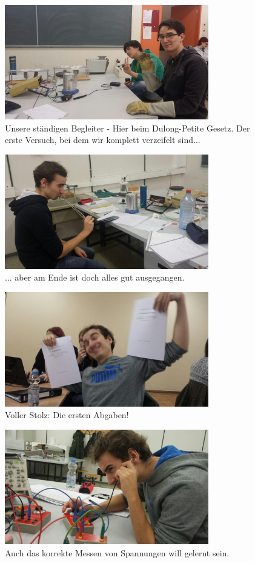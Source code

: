 \begin{figure}
  \centering
  \includegraphics[height=5cm]{extra/photo_2016-07-05_00-37-24.jpg}
  \caption{Unsere ständigen Begleiter - Hier beim Dulong-Petite Gesetz. Der erste Versuch, bei dem wir komplett verzeifelt sind...}
\end{figure}

\begin{figure}
  \centering
  \includegraphics[height=5cm]{extra/photo_2016-07-05_00-39-07.jpg}
  \caption{... aber am Ende ist doch alles gut ausgegangen.}
\end{figure}

\begin{figure}
  \centering
  \includegraphics[height=5cm]{extra/photo_2016-07-05_00-39-29.jpg}
  \caption{Voller Stolz: Die ersten Abgaben!}
\end{figure}

\begin{figure}
  \centering
  \includegraphics[height=5cm]{extra/photo_2016-07-05_00-40-34.jpg}
  \caption{Auch das korrekte Messen von Spannungen will gelernt sein.}
\end{figure}

